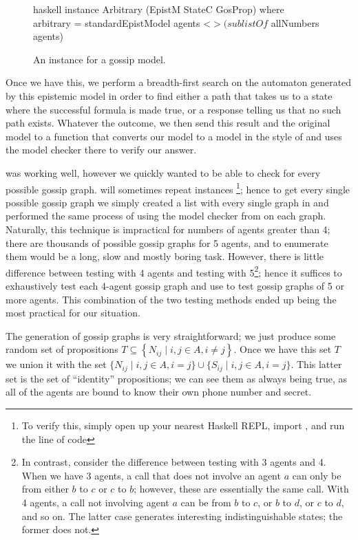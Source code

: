 \documentclass[ %
                    author={Leo Poulson},
                supervisor={Dr. Steven Ramsay},
                    degree={BSc},
                     title={Epistemic Planning for the Dynamic Gossip problem},
                  subtitle={},
                      year={2019} ]{dissertation}
\begin{document}
\begin{figure}[h]
  \centering
  \begin{cminted}{haskell}
      instance Arbitrary (EpistM StateC GosProp) where
        arbitrary = standardEpistModel agents <$> (sublistOf $ allNumbers agents)
  \end{cminted}
  \caption{An  instance for a gossip model.}
  \label{fig:Arbitrary}
\end{figure}

Once we have this, we perform a breadth-first search on the automaton generated
by this epistemic model in order to find either a path that takes us to a state
where the successful formula is made true, or a response telling us that no such
path exists. Whatever the outcome, we then send this result and the original
model to a function that converts our model to a model in the style of
\cite{GithubGossip} and uses the model checker there to verify our answer.

 was working well, however we quickly wanted to be able to check
for every possible gossip graph.  will sometimes repeat
instances \footnote{To verify this, simply open up your nearest Haskell REPL,
  import , and run the line of code }; hence to get every single
possible gossip graph we simply created a list with every single graph in and
performed the same process of using the model checker from \cite{GithubGossip}
on each graph. Naturally, this technique is impractical for numbers of agents
greater than 4; there are thousands of possible gossip graphs for 5 agents, and
to enumerate them would be a long, slow and mostly boring task. However, there
is little difference between testing with 4 agents and testing with
5\footnote{In contrast, consider the difference between testing with 3 agents
  and 4. When we have 3 agents, a call that does not involve an agent $a$ can
  only be from either $b$ to $c$ or $c$ to $b$; however, these are essentially
  the same call. With 4 agents, a call not involving agent $a$ can be from $b$
  to $c$, or $b$ to $d$, or $c$ to $d$, and so on. The latter case generates
  interesting indistinguishable states; the former does not.}; hence it suffices
to exhaustively test each 4-agent gossip graph and use  to test
gossip graphs of 5 or more agents. This combination of the two testing methods
ended up being the most practical for our situation.

The generation of gossip graphs is very straightforward; we just produce some
random set of propositions $T \subseteq \left\{ N_{ij} \mid i, j \in A, i \not =
  j \right\}$. Once we have this set $T$ we union it with the set 
$\{N_{ij} \mid i, j \in A, i = j\} \cup \{S_{ij} \mid i, j \in A,
i = j\}$. This latter set is the set of ``identity'' propositions; we can see
them as always being true, as all of the agents are bound to know their own
phone number and secret.
\end{document}
